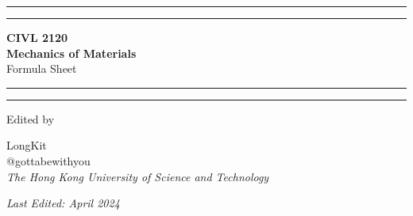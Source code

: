 \documentclass[twoside]{article}
\begin{document}
	
	\begin{titlepage}
		\centering
		\scshape
		\vspace*{\baselineskip}
		
		\rule{\textwidth}{1.6pt}\vspace*{-\baselineskip}\vspace*{2pt} %
		\rule{\textwidth}{0.4pt} %
		
		\vspace{0.5\baselineskip}
		
		{\LARGE \textbf{CIVL 2120 \\ Mechanics of Materials} \\
		
		\vspace{0.75\baselineskip}
		\Large Formula Sheet}
		
		\vspace{0.5\baselineskip} %
		
		\rule{\textwidth}{0.4pt}\vspace*{-\baselineskip}\vspace{3.2pt} %
		\rule{\textwidth}{1.6pt} %
		
		\vspace*{2\baselineskip} %
		
		{\Large Edited by
		
		\Large LongKit \\
		\vspace{7.5pt}
			\small \normalfont \faGithub \hspace{2.5pt} @gottabewithyou \\
			\vspace{10pt}
			\large \textit{The Hong Kong University of Science and Technology}}
		
		\vspace{10\baselineskip}
		
		\textit{Last Edited: April 2024}
		
	\end{titlepage}
	
	\newpage
	
	\pagestyle{fancy}
	\fancyhf{}
	\renewcommand{\headrule}{%
		\vspace{1pt}\hrulefill
		\raisebox{-2.1pt}{\quad \floweroneleft \decotwo \floweroneright \quad}\hrulefill}
	
\end{document}
